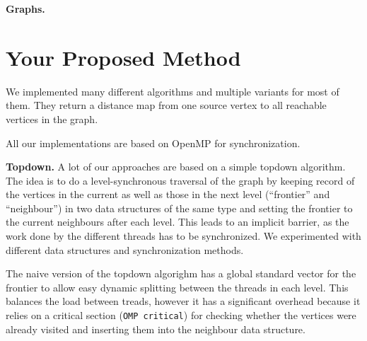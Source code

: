\documentclass[letterpaper]{article}
\newcommand{\mypar}[1]{{\bf #1.}} %
\begin{document}
	
	\mypar{Graphs}
	
	
	
	
	\section{Your Proposed Method}\label{sec:yourmethod}
	
	
	We implemented many different algorithms and multiple variants for most of them. They return a distance map from one source vertex to all reachable vertices in the graph.
	
	All our implementations are based on OpenMP for synchronization.
	
	
	\mypar{Topdown}
	A lot of our approaches are based on a simple topdown algorithm. The idea is to do a level-synchronous traversal of the graph by keeping record of the vertices in the current as well as those in the next level (``frontier'' and ``neighbour'') in two data structures of the same type and setting the frontier to the current neighbours after each level. This leads to an implicit barrier, as the work done by the different threads has to be synchronized. We experimented with different data structures and synchronization methods.
	
	The naive version of the topdown algorighm has a global standard vector for the frontier to allow easy dynamic splitting between the threads in each level. This balances the load between treads, however it has a significant overhead because it relies on a critical section (\verb+OMP critical+) for checking whether the vertices were already visited and inserting them into the neighbour data structure.
	
\end{document}
